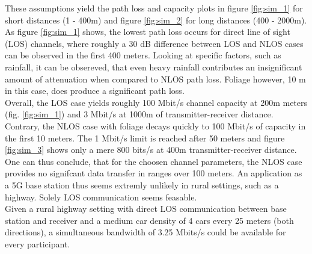 These assumptions yield the path loss and capacity plots in figure \ref{fig:sim_1} for short distances
(1 - 400m) and figure  \ref{fig:sim_2} for long distances (400 - 2000m). As figure \ref{fig:sim_1} shows, the 
lowest path loss occurs for direct line of sight (LOS) channels, where roughly a 30 dB difference 
between LOS and NLOS cases can be observed in the first 400 meters. Looking at specific factors, such as rainfall, 
it can be obsereved, that even heavy rainfall contributes an insignificant amount of attenuation when compared to NLOS path loss.
Foliage however, 10 m in this case, does produce a significant path loss. \\
Overall, the LOS case yields roughly 100 Mbit/s channel capacity at 200m meters (fig. \ref{fig:sim_1}) and
3 Mbit/s at 1000m of transmitter-receiver distance. \\
Contrary, the NLOS case with foliage decays quickly to 100 Mbit/s of capacity in the first 10 meters. 
The 1 Mbit/s limit is reached after 50 meters and figure \ref{fig:sim_3} shows only a mere 800 bits/s at 400m transmitter-receiver 
distance.\\
One can thus conclude, that for the choosen channel parameters, the NLOS case provides no signifcant data
transfer in ranges over 100 meters. An application as a 5G base station thus seems extremly unlikely in rural 
settings, such as a highway. Solely LOS communication seems feasable. \\
Given a rural highway setting with direct LOS communication between base station and receiver and a medium car density
of 4 cars every 25 meters (both directions), a simultaneous bandwidth of 3.25 Mbits/s could be available for every
participant.

